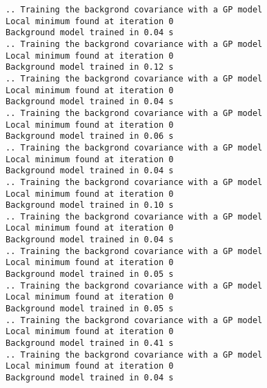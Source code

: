 \documentclass{article}
\begin{document}
    \begin{Verbatim}[commandchars=\\\{\}]
.. Training the backgrond covariance with a GP model
Local minimum found at iteration 0
Background model trained in 0.04 s
.. Training the backgrond covariance with a GP model
Local minimum found at iteration 0
Background model trained in 0.12 s
.. Training the backgrond covariance with a GP model
Local minimum found at iteration 0
Background model trained in 0.04 s
.. Training the backgrond covariance with a GP model
Local minimum found at iteration 0
Background model trained in 0.06 s
.. Training the backgrond covariance with a GP model
Local minimum found at iteration 0
Background model trained in 0.04 s
.. Training the backgrond covariance with a GP model
Local minimum found at iteration 0
Background model trained in 0.10 s
.. Training the backgrond covariance with a GP model
Local minimum found at iteration 0
Background model trained in 0.04 s
.. Training the backgrond covariance with a GP model
Local minimum found at iteration 0
Background model trained in 0.05 s
.. Training the backgrond covariance with a GP model
Local minimum found at iteration 0
Background model trained in 0.05 s
.. Training the backgrond covariance with a GP model
Local minimum found at iteration 0
Background model trained in 0.41 s
.. Training the backgrond covariance with a GP model
Local minimum found at iteration 0
Background model trained in 0.04 s
    \end{Verbatim}
\end{document}
